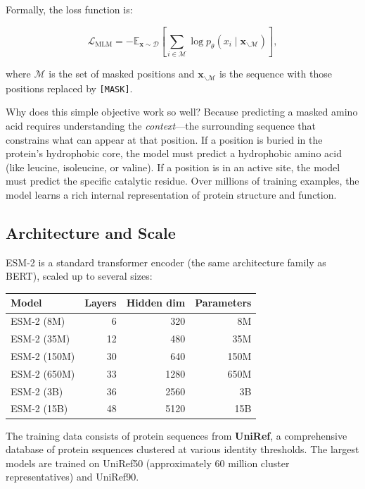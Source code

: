 Formally, the loss function is:

\begin{equation}
\mathcal{L}_{\mathrm{MLM}} = -\mathbb{E}_{\mathbf{x} \sim \mathcal{D}} \left[ \sum_{i \in \mathcal{M}} \log p_\theta(x_i \mid \mathbf{x}_{\backslash \mathcal{M}}) \right],
\label{eq:esm-mlm}
\end{equation}

where $\mathcal{M}$ is the set of masked positions and $\mathbf{x}_{\backslash \mathcal{M}}$ is the sequence with those positions replaced by \texttt{[MASK]}.

Why does this simple objective work so well? Because predicting a masked amino acid requires understanding the \emph{context}---the surrounding sequence that constrains what can appear at that position. If a position is buried in the protein's hydrophobic core, the model must predict a hydrophobic amino acid (like leucine, isoleucine, or valine). If a position is in an active site, the model must predict the specific catalytic residue. Over millions of training examples, the model learns a rich internal representation of protein structure and function.

\subsection{Architecture and Scale}

ESM-2 is a standard transformer encoder (the same architecture family as BERT), scaled up to several sizes:

\begin{center}
\begin{tabular}{lrrr}
\toprule
\textbf{Model} & \textbf{Layers} & \textbf{Hidden dim} & \textbf{Parameters} \\
\midrule
ESM-2 (8M) & 6 & 320 & 8M \\
ESM-2 (35M) & 12 & 480 & 35M \\
ESM-2 (150M) & 30 & 640 & 150M \\
ESM-2 (650M) & 33 & 1280 & 650M \\
ESM-2 (3B) & 36 & 2560 & 3B \\
ESM-2 (15B) & 48 & 5120 & 15B \\
\bottomrule
\end{tabular}
\end{center}

The training data consists of protein sequences from \textbf{UniRef}, a comprehensive database of protein sequences clustered at various identity thresholds. The largest models are trained on UniRef50 (approximately 60 million cluster representatives) and UniRef90.

